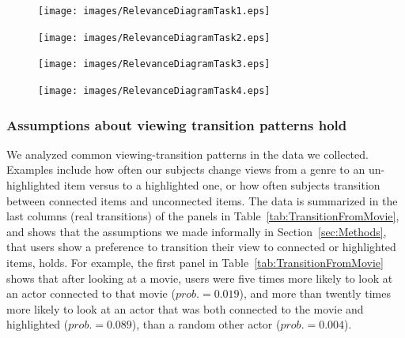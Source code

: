 \begin{figure}[!htb]
  \centering
  \texttt{[image: images/RelevanceDiagramTask1.eps]}
	
	\texttt{[image: images/RelevanceDiagramTask2.eps]}
	
	\texttt{[image: images/RelevanceDiagramTask3.eps]}
	
	\texttt{[image: images/RelevanceDiagramTask4.eps]}
	
	\label{fig:RelevanceDiagram}
\end{figure}





\subsubsection{Assumptions about viewing transition patterns hold}
We analyzed common viewing-transition patterns in the data we collected. Examples include how often our subjects change views from a genre to an un-highlighted item versus to a highlighted one, or how often subjects transition between connected items and unconnected items. The data is summarized in the last columns  (real transitions) of the panels in Table~\ref{tab:TransitionFromMovie}, and shows that the assumptions we made informally in Section~\ref{sec:Methods}, that users show a preference to transition their view to connected or highlighted items, holds. For example, the first panel in Table~\ref{tab:TransitionFromMovie} shows that after looking at a movie, users were five times more likely to look at an actor connected to that movie ($prob. = 0.019$), and more than twently times more likely to look at an actor that was both connected to the movie and highlighted ($prob. = 0.089$), than a random other actor ($prob. = 0.004$).  


